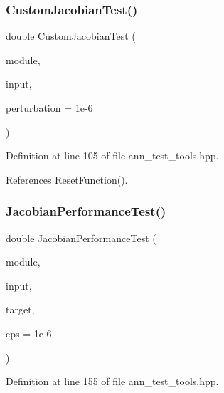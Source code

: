 \mbox{\label{ann__test__tools_8hpp_a06340d9e2c0ed07062ca1ba10f30ec92}} 
\subsubsection{Custom\+Jacobian\+Test()}
{\footnotesize\ttfamily double Custom\+Jacobian\+Test (\begin{DoxyParamCaption}\item[{Module\+Type \&}]{module,  }\item[{arma\+::mat \&}]{input,  }\item[{const double}]{perturbation = {\ttfamily 1e-\/6} }\end{DoxyParamCaption})}



Definition at line 105 of file ann\+\_\+test\+\_\+tools.\+hpp.



References Reset\+Function().

\mbox{\label{ann__test__tools_8hpp_a07d364fc0ab9e484ce9b46ac2732ca42}} 
\subsubsection{Jacobian\+Performance\+Test()}
{\footnotesize\ttfamily double Jacobian\+Performance\+Test (\begin{DoxyParamCaption}\item[{Module\+Type \&}]{module,  }\item[{arma\+::mat \&}]{input,  }\item[{arma\+::mat \&}]{target,  }\item[{const double}]{eps = {\ttfamily 1e-\/6} }\end{DoxyParamCaption})}



Definition at line 155 of file ann\+\_\+test\+\_\+tools.\+hpp.

\mbox{\label{ann__test__tools_8hpp_a6c1852980c9a5957091df64a2e33016c}} 
